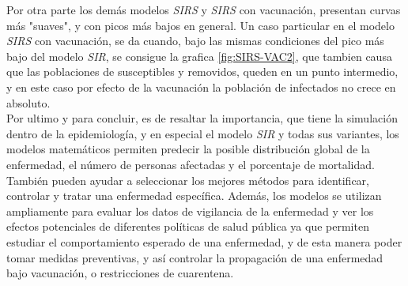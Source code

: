\documentclass[journal]{IEEEtran}
\begin{document}
Por otra parte los demás modelos \textit{SIRS} y \textit{SIRS} con vacunación, presentan curvas más "suaves", y con picos más bajos en general.
Un caso particular en el modelo \textit{SIRS} con vacunación, se da cuando, bajo las mismas condiciones del pico más bajo del modelo \textit{SIR},
se consigue la grafica \ref{fig:SIRS-VAC2}, que tambien causa que las poblaciones de susceptibles y removidos, queden en un punto intermedio,
y en este caso por efecto de la vacunación la población de infectados no crece en absoluto.\\

Por ultimo y para concluir, es de resaltar la importancia, que tiene la simulación dentro de la epidemiología, y en especial
el modelo \textit{SIR} y todas sus variantes, los modelos matemáticos permiten predecir la posible distribución global de la
enfermedad, el número de personas afectadas y el porcentaje de mortalidad. También pueden ayudar a seleccionar
los mejores métodos para identificar, controlar y tratar una enfermedad específica. Además, los modelos se utilizan ampliamente para evaluar 
los datos de vigilancia de la enfermedad y ver los efectos potenciales de diferentes políticas de salud pública ya que permiten estudiar 
el comportamiento esperado de una enfermedad, y de esta manera poder tomar medidas preventivas, y así controlar la propagación de una enfermedad
bajo vacunación, o restricciones de cuarentena. 

\ifCLASSOPTIONcaptionsoff
	\newpage
\fi
\end{document}
